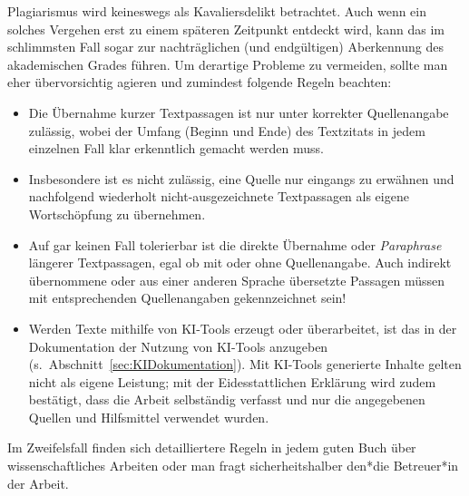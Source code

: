Plagiarismus wird keineswegs als Kavaliersdelikt betrachtet. Auch wenn ein solches
Vergehen erst zu einem späteren Zeitpunkt entdeckt wird, kann das im schlimmsten
Fall sogar zur nachträglichen (und endgültigen) Aberkennung des akademischen
Grades führen. Um derartige Probleme zu vermeiden, sollte man eher übervorsichtig
agieren und zumindest folgende Regeln beachten:
%
\begin{itemize}
    \item
    Die Übernahme kurzer Textpassagen ist nur unter korrekter Quellenangabe
    zulässig, wobei der Umfang (Beginn und Ende) des Textzitats in jedem
    einzelnen Fall klar erkenntlich gemacht werden muss.
    \item
    Insbesondere ist es nicht zulässig, eine Quelle nur eingangs zu erwähnen
    und nachfolgend wiederholt nicht-ausgezeichnete Textpassagen als eigene
    Wortschöpfung zu übernehmen.
    \item
    Auf gar keinen Fall tolerierbar ist die direkte Übernahme oder
    \emph{Paraphrase} längerer Textpassagen, egal ob mit oder ohne
    Quellenangabe. Auch indirekt übernommene oder aus einer anderen Sprache
    übersetzte Passagen müssen mit entsprechenden Quellenangaben
    gekennzeichnet sein!
    \item
    Werden Texte mithilfe von KI-Tools erzeugt oder überarbeitet, ist das in
    der Dokumentation der Nutzung von KI-Tools anzugeben (s.\
    Abschnitt~\ref{sec:KIDokumentation}). Mit KI-Tools generierte Inhalte
    gelten nicht als eigene Leistung; mit der Eidesstattlichen Erklärung wird
    zudem bestätigt, dass die Arbeit selbständig verfasst und nur die
    angegebenen Quellen und Hilfsmittel verwendet wurden.
\end{itemize}
%
Im Zweifelsfall finden sich detailliertere Regeln in jedem guten Buch über
wissenschaftliches Arbeiten oder man fragt sicherheitshalber den*die
Betreuer*in der Arbeit.
